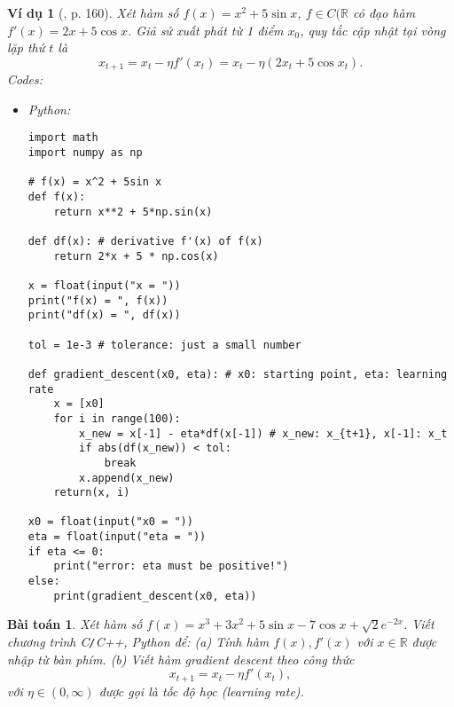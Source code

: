 \documentclass{article}
\newtheorem{baitoan}{Bài toán}
\newtheorem{vidu}{Ví dụ}
\begin{document}
\begin{vidu}[\cite{Tiep_ML_co_ban}, p. 160]
	Xét hàm số $f(x) = x^2 + 5\sin x$, $f\in C(\mathbb{R}$ có đạo hàm $f'(x) = 2x + 5\cos x$. Giả sử xuất phát từ 1 điểm $x_0$, quy tắc cập nhật tại vòng lặp thứ $t$ là
	\begin{equation*}
		x_{t+1} = x_t - \eta f'(x_t) = x_t - \eta(2x_t + 5\cos x_t).
	\end{equation*}
	Codes:
	\begin{itemize}
		\item Python:
		\begin{verbatim}
import math
import numpy as np

# f(x) = x^2 + 5sin x
def f(x):
    return x**2 + 5*np.sin(x)

def df(x): # derivative f'(x) of f(x)
    return 2*x + 5 * np.cos(x)

x = float(input("x = "))
print("f(x) = ", f(x))
print("df(x) = ", df(x))

tol = 1e-3 # tolerance: just a small number

def gradient_descent(x0, eta): # x0: starting point, eta: learning rate
    x = [x0]
    for i in range(100):
        x_new = x[-1] - eta*df(x[-1]) # x_new: x_{t+1}, x[-1]: x_t
        if abs(df(x_new)) < tol:
            break
        x.append(x_new)
    return(x, i)

x0 = float(input("x0 = "))
eta = float(input("eta = "))
if eta <= 0:
    print("error: eta must be positive!")
else:
    print(gradient_descent(x0, eta))
		\end{verbatim}
	\end{itemize}
\end{vidu}

\begin{baitoan}
	Xét hàm số $f(x) = x^3 + 3x^2 + 5\sin x - 7\cos x + \sqrt{2}e^{-2x}$. Viết chương trình {\sf C{\tt/}C++, Python} để: (a) Tính hàm $f(x),f'(x)$ với $x\in\mathbb{R}$ được nhập từ bàn phím. (b) Viết hàm gradient descent theo công thức
	\begin{equation*}
		x_{t+1} = x_t - \eta f'(x_t),
	\end{equation*}
	với $\eta\in(0,\infty)$ được gọi là {\rm tốc độ học (learning rate)}.
\end{baitoan}
\end{document}
